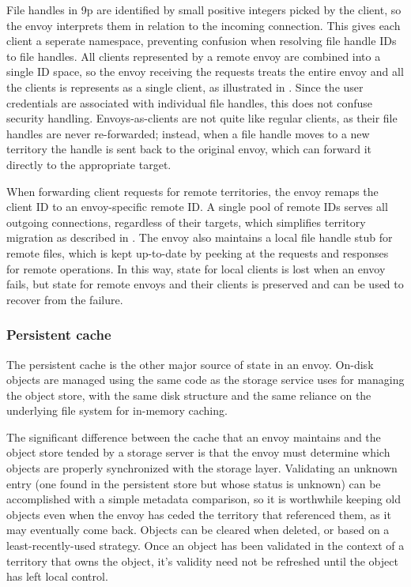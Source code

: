 File handles in 9p are identified by small positive integers picked by the client, so the envoy interprets them in relation to the incoming connection. This gives each client a seperate namespace, preventing confusion when resolving file handle IDs to file handles. All clients represented by a remote envoy are combined into a single ID space, so the envoy receiving the requests treats the entire envoy and all the clients is represents as a single client, as illustrated in . Since the user credentials are associated with individual file handles, this does not confuse security handling. Envoys-as-clients are not quite like regular clients, as their file handles are never re-forwarded; instead, when a file handle moves to a new territory the handle is sent back to the original envoy, which can forward it directly to the appropriate target.

When forwarding client requests for remote territories, the envoy remaps the client ID to an envoy-specific remote ID. A single pool of remote IDs serves all outgoing connections, regardless of their targets, which simplifies territory migration as described in . The envoy also maintains a local file handle stub for remote files, which is kept up-to-date by peeking at the requests and responses for remote operations. In this way, state for local clients is lost when an envoy fails, but state for remote envoys and their clients is preserved and can be used to recover from the failure.

\subsubsection{Persistent cache}

The persistent cache is the other major source of state in an envoy. On-disk objects are managed using the same code as the storage service uses for managing the object store, with the same disk structure and the same reliance on the underlying file system for in-memory caching.

The significant difference between the cache that an envoy maintains and the object store tended by a storage server is that the envoy must determine which objects are properly synchronized with the storage layer. Validating an unknown entry (one found in the persistent store but whose status is unknown) can be accomplished with a simple metadata comparison, so it is worthwhile keeping old objects even when the envoy has ceded the territory that referenced them, as it may eventually come back. Objects can be cleared when deleted, or based on a least-recently-used strategy. Once an object has been validated in the context of a territory that owns the object, it's validity need not be refreshed until the object has left local control.

